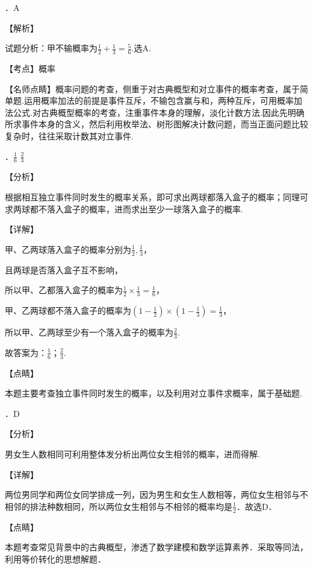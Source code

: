\noindent 

．A

\noindent 【解析】

\noindent 试题分析：甲不输概率为$\frac{1}{2}+\frac{1}{3}=\frac{5}{6}.$选A.

\noindent 【考点】概率

\noindent 【名师点睛】概率问题的考查，侧重于对古典概型和对立事件的概率考查，属于简单题.运用概率加法的前提是事件互斥，不输包含赢与和，两种互斥，可用概率加法公式.对古典概型概率的考查，注重事件本身的理解，淡化计数方法.因此先明确所求事件本身的含义，然后利用枚举法、树形图解决计数问题，而当正面问题比较复杂时，往往采取计数其对立事件.

．$\frac{1}{6} $    $\frac{2}{3} $    

\noindent 【分析】

\noindent 根据相互独立事件同时发生的概率关系，即可求出两球都落入盒子的概率；同理可求两球都不落入盒子的概率，进而求出至少一球落入盒子的概率.

\noindent 【详解】

\noindent 甲、乙两球落入盒子的概率分别为$\frac{1}{2} ,\frac{1}{3} $，

\noindent 且两球是否落入盒子互不影响，

\noindent 所以甲、乙都落入盒子的概率为$\frac{1}{2} \times \frac{1}{3} =\frac{1}{6} $，

\noindent 甲、乙两球都不落入盒子的概率为$(1-\frac{1}{2} )\times (1-\frac{1}{3} )=\frac{1}{3} $，

\noindent 所以甲、乙两球至少有一个落入盒子的概率为$\frac{2}{3} $.

\noindent 故答案为：$\frac{1}{6} $；$\frac{2}{3} $.

\noindent 【点睛】

\noindent 本题主要考查独立事件同时发生的概率，以及利用对立事件求概率，属于基础题.

．D

\noindent 【分析】

\noindent 男女生人数相同可利用整体发分析出两位女生相邻的概率，进而得解.

\noindent 【详解】

\noindent 两位男同学和两位女同学排成一列，因为男生和女生人数相等，两位女生相邻与不相邻的排法种数相同，所以两位女生相邻与不相邻的概率均是$\frac{1}{2} $．故选D．

\noindent 【点睛】

\noindent 本题考查常见背景中的古典概型，渗透了数学建模和数学运算素养．采取等同法，利用等价转化的思想解题．

